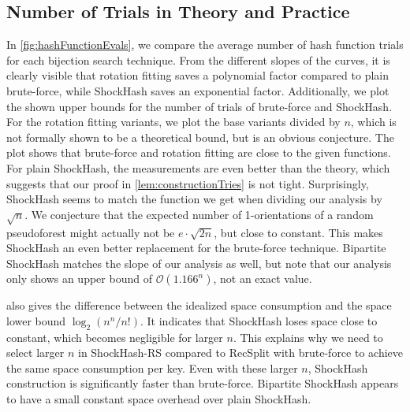 \documentclass[a4paper,USenglish,cleveref]{lipics-v2021}
\newcommand{\Oh}{\mathcal{O}}
\begin{document}
\subsection{Number of Trials in Theory and Practice}
In \cref{fig:hashFunctionEvals}, we compare the average number of hash function trials for each bijection search technique.
From the different slopes of the curves, it is clearly visible that rotation fitting \cite{bez2023high} saves a polynomial factor compared to plain brute-force, while ShockHash saves an exponential factor.
Additionally, we plot the shown upper bounds for the number of trials of brute-force and ShockHash.
For the rotation fitting variants, we plot the base variants divided by $n$, which is not formally shown to be a theoretical bound, but is an obvious conjecture.
The plot shows that brute-force and rotation fitting are close to the given functions.
For plain ShockHash, the measurements are even better than the theory, which suggests that our proof in \cref{lem:constructionTries} is not tight.
Surprisingly, ShockHash seems to match the function we get when dividing our analysis by $\sqrt{n}$.
We conjecture that the expected number of 1-orientations of a random pseudoforest might actually not be $e\cdot\sqrt{2n}$, but close to constant.
This makes ShockHash an even better replacement for the brute-force technique.
Bipartite ShockHash matches the slope of our analysis as well, but note that our analysis only shows an upper bound of $\Oh(1.166^n)$, not an exact value.

 also gives the difference between the idealized space consumption and the space lower bound $\log_2(n^n/n!)$.
It indicates that ShockHash loses space close to constant, which becomes negligible for larger $n$.
This explains why we need to select larger $n$ in ShockHash-RS compared to RecSplit with brute-force to achieve the same space consumption per key.
Even with these larger $n$, ShockHash construction is significantly faster than brute-force.
Bipartite ShockHash appears to have a small constant space overhead over plain ShockHash.
\end{document}
